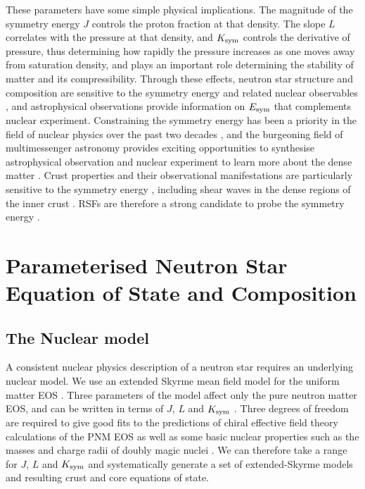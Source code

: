 \documentclass[fleqn,usenatbib]{mnras}
\begin{document}
\noindent These parameters have some simple physical implications. The magnitude of the symmetry energy $J$ controls the proton fraction at that density. The slope $L$ correlates with the pressure at that density, and $K_{\rm sym}$ controls the derivative of pressure, thus determining how rapidly the pressure increases as one moves away from saturation density, and plays an important role determining the stability of matter and its compressibility. Through these effects, neutron star structure and composition are sensitive to the symmetry energy and related nuclear observables \citep{Brown:2000aa, Horowitz:2001aa, Steiner:2008aa, Fattoyev:2018aa}, and astrophysical observations provide information on $E_{\rm sym}$ that complements nuclear experiment. Constraining the symmetry energy has been a priority in the field of nuclear physics over the past two decades \citep{Tsang:2012qy,Li:2014fj,Horowitz:2014aa}, and the burgeoning field of multimessenger astronomy provides exciting opportunities to synthesise astrophysical observation and nuclear experiment to learn more about the dense matter \citep{Tsang:2019ab}. Crust properties and their observational manifestations are particularly sensitive to the symmetry energy \citep{Newton:2013aaa}, including shear waves in the dense regions of the inner crust \citep{steiner2009constraints,Sotani2012a-crustosc,Sotani2013b-crustosc,Newton:2011crustosc}. RSFs are therefore a strong candidate to probe the symmetry energy \citep{tsang2012resonant,Newton:2013aaa}.

\section{Parameterised Neutron Star Equation of State and Composition}

\subsection{The Nuclear model} \label{sec:nuclear_model}

A consistent nuclear physics description of a neutron star requires an underlying nuclear model. We use an extended Skyrme mean field model for the uniform matter EOS \citep{holt2018universal}. Three parameters of the model affect only the pure neutron matter EOS, and can be written in terms of $J$, $L$ and $K_{\rm sym}$ \citep{newton2020nuclear,Balliet:2020aa}. Three degrees of freedom are required to give good fits to the predictions of chiral effective field theory calculations of the PNM EOS as well as some basic nuclear properties such as the masses and charge radii of doubly magic nuclei \cite{holt2018universal}. We can therefore take a range for $J$, $L$ and $K_{\rm sym}$ and systematically generate a set of extended-Skyrme models and resulting crust and core equations of state.
\end{document}
